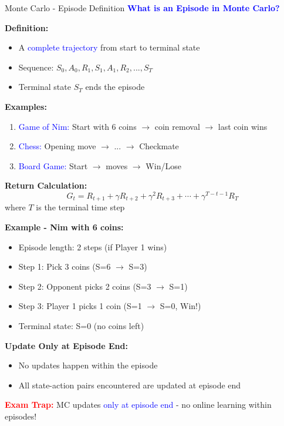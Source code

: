 \documentclass[8pt]{beamer}
\begin{document}
	\begin{frame}{Monte Carlo - Episode Definition}
		\fontsize{6.5}{7.5}\selectfont
		\textcolor{blue}{\textbf{What is an Episode in Monte Carlo?}}
		
		\textbf{Definition:}
		\begin{itemize}
			\item A \textcolor{blue}{complete trajectory} from start to terminal state
			\item Sequence: $S_0, A_0, R_1, S_1, A_1, R_2, ..., S_T$
			\item Terminal state $S_T$ ends the episode
		\end{itemize}
		
		\textbf{Examples:}
		\begin{enumerate}
			\item \textcolor{blue}{Game of Nim:} Start with 6 coins $\rightarrow$ coin removal $\rightarrow$ last coin wins
			\item \textcolor{blue}{Chess:} Opening move $\rightarrow$ ... $\rightarrow$ Checkmate
			\item \textcolor{blue}{Board Game:} Start $\rightarrow$ moves $\rightarrow$ Win/Lose
		\end{enumerate}
		
		\textbf{Return Calculation:}
		\[
		G_t = R_{t+1} + \gamma R_{t+2} + \gamma^2 R_{t+3} + \cdots + \gamma^{T-t-1} R_T
		\]
		where $T$ is the terminal time step
		
		\textbf{Example - Nim with 6 coins:}
		\begin{itemize}
			\item Episode length: 2 steps (if Player 1 wins)
			\item Step 1: Pick 3 coins (S=6 $\rightarrow$ S=3)
			\item Step 2: Opponent picks 2 coins (S=3 $\rightarrow$ S=1)
			\item Step 3: Player 1 picks 1 coin (S=1 $\rightarrow$ S=0, Win!)
			\item Terminal state: S=0 (no coins left)
		\end{itemize}
		
		\textbf{Update Only at Episode End:}
		\begin{itemize}
			\item No updates happen within the episode
			\item All state-action pairs encountered are updated at episode end
		\end{itemize}
		
		\textcolor{red}{\textbf{Exam Trap:}} MC updates \textcolor{blue}{only at episode end} - no online learning within episodes!
	\end{frame}
	
\end{document}

